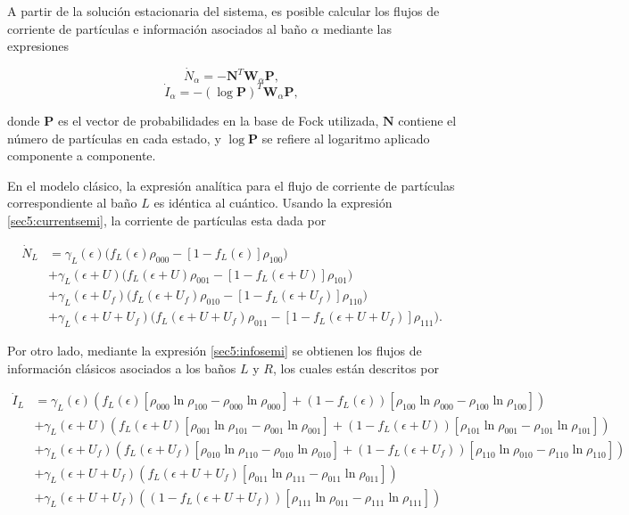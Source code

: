 A partir de la solución estacionaria del sistema, es posible calcular los flujos de corriente de partículas e información asociados al baño $\alpha$ mediante las expresiones

\begin{equation}
    \dot{N}_{\alpha} = -\mathbf{N}^{T} \mathbf{W}_{\alpha}\mathbf{P},
    \label{sec5:currentsemi}
\end{equation}
\begin{equation}
    \dot{I}_{\alpha} = -(\log \mathbf{P})^{T} \mathbf{W}_{\alpha}\mathbf{P},
    \label{sec5:infosemi}
\end{equation}

donde $\mathbf{P}$ es el vector de probabilidades en la base de Fock utilizada, $\mathbf{N}$ contiene el número de partículas en cada estado, y $\log \mathbf{P}$ se refiere al logaritmo aplicado componente a componente.

En el modelo clásico, la expresión analítica para el flujo de corriente de partículas correspondiente al baño $L$ es idéntica al cuántico. Usando la expresión \ref{sec5:currentsemi}, la corriente de partículas esta dada por  

\begin{align*}
    \dot{N}_{L} & = \gamma_{L}(\epsilon)\big(f_{L}(\epsilon)\rho_{000} - [1-f_{L}(\epsilon)]\rho_{100} \big) \\
        & + \gamma_{L}(\epsilon + U) \big(f_{L}(\epsilon+U)\rho_{001} - [1-f_{L}(\epsilon+U)]\rho_{101} \big)  \\
        & + \gamma_{L}(\epsilon + U_{f}) \big(f_{L}(\epsilon+U_{f})\rho_{010} - [1-f_{L}(\epsilon+U_{f})]\rho_{110} \big)  \\  
        & + \gamma_{L}(\epsilon + U + U_{f}) \big(f_{L}(\epsilon+U + U_{f})\rho_{011} - [1-f_{L}(\epsilon+U+U_{f})]\rho_{111} \big).
\end{align*}

Por otro lado, mediante la expresión \ref{sec5:infosemi} se obtienen los flujos de información clásicos asociados a los baños $L$ y $R$, los cuales están descritos por

\begin{align*}
  \dot{I}_{L}  &  =  \gamma_{L}(\epsilon)(f_{L}(\epsilon)[\rho_{000}\ln \rho_{100} - \rho_{000}\ln \rho_{000}] + (1-f_{L}(\epsilon))[\rho_{100}\ln \rho_{000} - \rho_{100}\ln \rho_{100} ] )  \\ 
      & + \gamma_{L}(\epsilon + U)(f_{L}(\epsilon + U)[\rho_{001}\ln \rho_{101} - \rho_{001}\ln \rho_{001}] + (1-f_{L}(\epsilon + U))[\rho_{101}\ln \rho_{001} -\rho_{101}\ln \rho_{101} ]   ) \\  
      & + \gamma_{L}(\epsilon + U_{f})( f_{L}(\epsilon + U_{f})[\rho_{010}\ln \rho_{110} -\rho_{010}\ln \rho_{010} ]  + (1-f_{L}(\epsilon + U_{f}))[\rho_{110}\ln \rho_{010} - \rho_{110}\ln \rho_{110} ] ) \\  
      & + \gamma_{L}(\epsilon + U + U_{f})( f_{L}(\epsilon + U + U_{f})[\rho_{011}\ln \rho_{111}- \rho_{011}\ln \rho_{011}]) \\   
      & + \gamma_{L}(\epsilon + U + U_{f})( (1-f_{L}(\epsilon+U+U_{f}) )[\rho_{111}\ln \rho_{011} - \rho_{111}\ln \rho_{111}])   
\end{align*}


